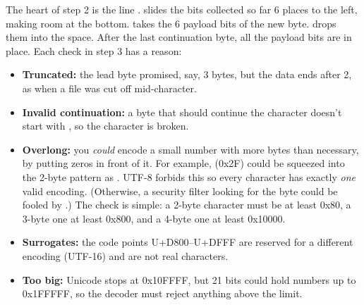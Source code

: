 \documentclass[10pt,a4paper]{article}
\begin{document}
The heart of step 2 is the line .  slides the bits collected so far 6 places to the left, making room at the bottom.  takes the 6 payload bits of the new byte. \code{\textbar{}\allowbreak{}} drops them into the space. After the last continuation byte, all the payload bits are in place.
Each check in step 3 has a reason:
\begin{itemize}
\item \textbf{Truncated:} the lead byte promised, say, 3 bytes, but the data ends after 2, as when a file was cut off mid-character.
\item \textbf{Invalid continuation:} a byte that should continue the character doesn’t start with , so the character is broken.
\item \textbf{Overlong:} you \emph{could} encode a small number with more bytes than necessary, by putting zeros in front of it. For example, \code{/\allowbreak{}} (0x2F) could be squeezed into the 2-byte pattern as . UTF-8 forbids this so every character has exactly \emph{one} valid encoding. (Otherwise, a security filter looking for the byte \code{/\allowbreak{}} could be fooled by .) The check is simple: a 2-byte character must be at least 0x80, a 3-byte one at least 0x800, and a 4-byte one at least 0x10000.
\item \textbf{Surrogates:} the code points U+D800–U+DFFF are reserved for a different encoding (UTF-16) and are not real characters.
\item \textbf{Too big:} Unicode stops at 0x10FFFF, but 21 bits could hold numbers up to 0x1FFFFF, so the decoder must reject anything above the limit.
\end{itemize}
\end{document}
